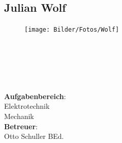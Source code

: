 \subsection*{Julian Wolf}
\begin{figure}
\begin{center}
  \texttt{[image: Bilder/Fotos/Wolf]}
\end{center}
\end{figure}
\mbox{}\\
\mbox{}\\
\mbox{}\\
\mbox{}\\
\mbox{}\\
\textbf{Aufgabenbereich}:\\
Elektrotechnik\\
Mechanik\\
\textbf{Betreuer}:\\
Otto Schuller BEd.